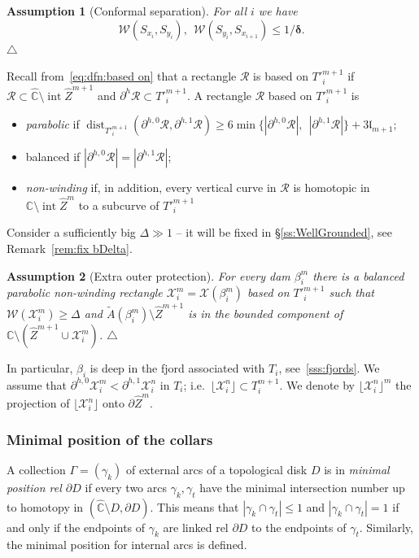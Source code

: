 \documentclass{amsart}
\newcommand\xqed[1]{%
  \leavevmode\unskip\penalty9999 \hbox{}\nobreak\hfill
  \quad\hbox{#1}}
\newcommand\tqed{\xqed{$\triangle$}}
\renewcommand{\sp}{{\ \ }}
\newcommand{\1}{{\mathbb 1 }}
\newcommand{\Width}{{\mathcal W}}
\newcommand{\bDelta}{{\mathbb{\Delta}}}
\newcommand\RR{\mathcal{R}}
\newcommand\XX{\mathcal{X}}
\newcommand\intr{\operatorname{int}}
\newcommand{\wZ}{{\widehat Z}}
\newcommand{\length}{{\mathfrak l}}
\newcommand{\wC}{\widehat{\mathbb{C}}}
\newcommand{\C}{\mathbb{C}}
\newtheorem{assum}{Assumption}
\theoremstyle{remark}
\numberwithin{equation}{section}
\theoremstyle{definition}
\newcommand{\dist}{\operatorname{dist}}
\newcommand{\bdelta}{{\boldsymbol{ \delta}}}
\begin{document}
\begin{assum}[Conformal separation]
\label{ass:wZ:bDelta}
For all $i$ we have
\[ \Width(S_{x_i}, S_{y_i}),\sp \Width(S_{y_i}, S_{x_{i+1}})\le 1/\bdelta.\]\tqed
\end{assum}


Recall from~\eqref{eq:dfn:based on} that a rectangle $\RR$ is based on $T'^{m+1}_i$ if $\RR\subset \wC\setminus \intr \wZ^{m+1}$ and $\partial^h \RR\subset T'^{m+1}_i$. A rectangle $\RR$ based on $T'^{m+1}_i$ is
\begin{itemize}
\item \emph{parabolic} if $\dist_{T'^{m+1}_i}(\partial^{h,0} \RR,\partial^{h,1} \RR) \ge 6\min \{ | \partial^{h,0}\RR|,\sp | \partial^{h,1}\RR| \} +3\length_{m+1};$
\item balanced if $|\partial^{h,0}\RR|=|\partial^{h,1}\RR|$;
\item \emph{non-winding} if, in addition, every vertical curve in $\RR$ is homotopic in ${\C\setminus \intr \wZ^m}$ to a subcurve of $T'^{m+1}_i$ 
\end{itemize}



Consider a sufficiently big $\bDelta \gg 1$ -- it will be fixed in \S\ref{ss:WellGrounded}, see Remark~\ref{rem:fix bDelta}.


\begin{assum}[Extra outer protection]
\label{ass:wZ:EtraProt}
For every dam $\beta^m_i$ there is a balanced parabolic non-winding rectangle $\XX^m_i=\XX(\beta^m_i)$ based on $T'^{m+1}_i$ such that $\Width(\XX^m_i)\ge \bDelta$ and $\widetilde A(\beta^m_i)\setminus \wZ^{m+1}$ is in the bounded component of $\C\setminus( \wZ^{m+1}\cup \XX^m_i)$. \tqed
\end{assum}

In particular, $\beta_i$ is deep in the fjord associated with $T_i$, see~\ref{sss:fjords}. We assume that $\partial^{h,0} \XX^m_i < \partial^{h,1} \XX^n_i$ in $T_i$; i.e.~$\lfloor \XX^n_i \rfloor\subset T^{m+1}_i$. We denote by $\lfloor \XX^n_i \rfloor^m$ the projection of $\lfloor \XX^n_i \rfloor$ onto $\partial \wZ^m$.

\subsubsection{Minimal position of the collars} A collection $\Gamma=(\gamma_k)$ of external arcs of a topological disk $D$ is in \emph{minimal position rel $\partial D$} if every two arcs $\gamma_k, \gamma_t$ have the minimal intersection number up to homotopy in $(\wC\setminus D, \partial D)$. This means that $|\gamma_k\cap \gamma_t|\le 1$ and  $|\gamma_k\cap \gamma_t|= 1$ if and only if the endpoints of $\gamma_k$ are linked rel $\partial D$ to the endpoints of $\gamma_t$. Similarly, the minimal position for internal arcs is defined.
\end{document}
